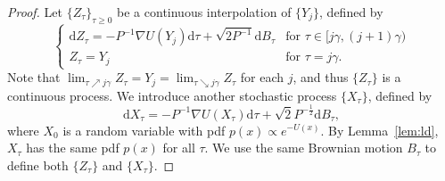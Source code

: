 \documentclass[11pt]{article}
\theoremstyle{plain}
\theoremstyle{definition}
\theoremstyle{remark}
\begin{document}
\begin{proof}
Let $\{Z_{\tau}\}_{{\tau}\geq 0}$ be a continuous interpolation of $\{Y_j\}$, defined by
\begin{equation}\label{eq:sde_z}
\left \{
\begin{array}{ll}
\mathrm{d} Z_{\tau} = - P^{-1} \nabla U(Y_j) \mathrm{d}{\tau} + \sqrt{2P^{-1}} \mathrm{d} B_{\tau}& \mbox{for }{\tau} \in [j\gamma, (j+1) \gamma) \\
Z_{\tau} = Y_j & \mbox{for } {\tau} = j\gamma.
\end{array}
\right.
\end{equation}
Note that $\lim_{{\tau} \nearrow j\gamma} Z_{\tau} = Y_j =  \lim_{{\tau} \searrow j\gamma} Z_{\tau}$ for each $j$, and thus $\{Z_{\tau}\}$ is a continuous process. 
We introduce another stochastic process $\{X_{\tau}\}$, defined by 
\[
\mathrm{d} X_{\tau} = -P^{-1} \nabla U( X_{\tau}) \mathrm{d} {\tau} + \sqrt{2} P^{-\frac{1}{2}} \mathrm{d} B_{\tau},
\]
where $X_0$ is a random variable with pdf $p(x) \propto e^{-U(x)}$.
By Lemma~\ref{lem:ld}, $X_{\tau}$ has the same pdf $p(x)$ for all ${\tau}$. 
We use the same Brownian motion $B_{\tau}$ to define both $\{Z_{\tau}\}$ and $\{X_{\tau}\}$.


\end{proof}
\end{document}
